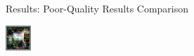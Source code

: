 \documentclass[10pt]{beamer}
\begin{document}
\begin{frame}{Results: Poor-Quality Results Comparison}
\begin{center}
      \includegraphics[width=0.3\linewidth]{./img/decoded_imgs/horse_64B.png}
    \end{center}
    \begin{figure}
      \begin{minipage}{\textwidth}
               \\
      \end{minipage}
  \end{figure}
  \end{frame}
\end{document}
